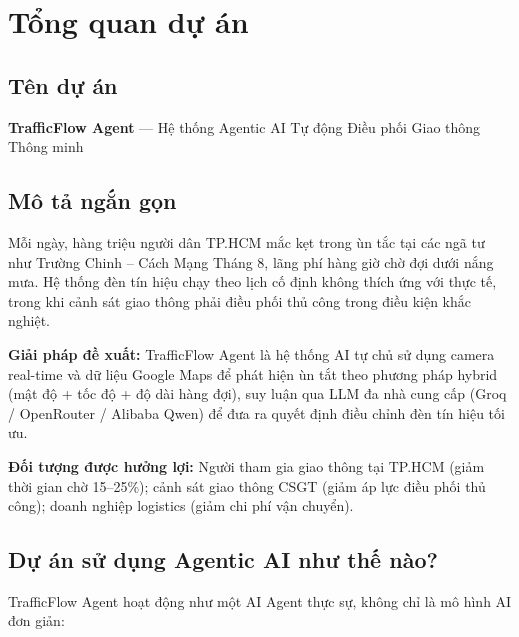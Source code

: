 \documentclass[12pt,a4paper]{article}
\begin{document}
\newpage
{}

\section{Tổng quan dự án}

\subsection{Tên dự án}
\textbf{TrafficFlow Agent} — Hệ thống Agentic AI Tự động Điều phối Giao thông Thông minh

\subsection{Mô tả ngắn gọn}

Mỗi ngày, hàng triệu người dân TP.HCM mắc kẹt trong ùn tắc tại các ngã tư như Trường Chinh – Cách Mạng Tháng 8, lãng phí hàng giờ chờ đợi dưới nắng mưa. Hệ thống đèn tín hiệu chạy theo lịch cố định không thích ứng với thực tế, trong khi cảnh sát giao thông phải điều phối thủ công trong điều kiện khắc nghiệt.

\textbf{Giải pháp đề xuất:} TrafficFlow Agent là hệ thống AI tự chủ sử dụng camera real-time và dữ liệu Google Maps để phát hiện ùn tắt theo phương pháp hybrid (mật độ + tốc độ + độ dài hàng đợi), suy luận qua LLM đa nhà cung cấp (Groq / OpenRouter / Alibaba Qwen) để đưa ra quyết định điều chỉnh đèn tín hiệu tối ưu.

\textbf{Đối tượng được hưởng lợi:} Người tham gia giao thông tại TP.HCM (giảm thời gian chờ 15--25\%); cảnh sát giao thông CSGT (giảm áp lực điều phối thủ công); doanh nghiệp logistics (giảm chi phí vận chuyển).

\subsection{Dự án sử dụng Agentic AI như thế nào?}

TrafficFlow Agent hoạt động như một AI Agent thực sự, không chỉ là mô hình AI đơn giản:
\end{document}
